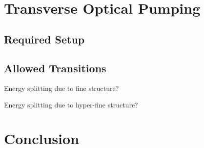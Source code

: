 \documentclass[12pt]{article}
\begin{document}
\section{Transverse Optical Pumping}

	\subsection{Required Setup}

	\subsection{Allowed Transitions}

        Energy splitting due to fine structure?

        Energy splitting due to hyper-fine structure?

\section{Conclusion}



\end{document}

